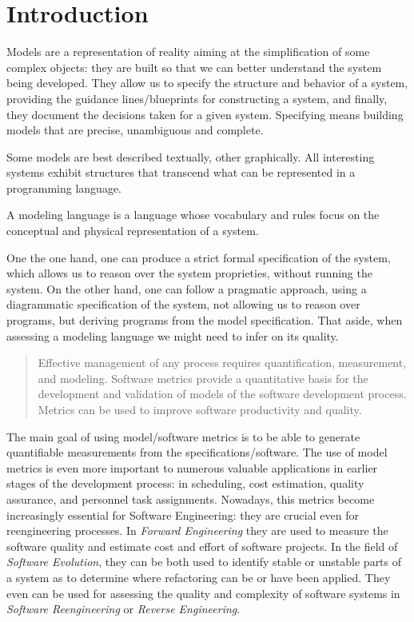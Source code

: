 \section{Introduction}

Models are a representation of reality aiming at the simplification of some complex objects: they are built so that we can better understand the system being developed.
They allow us to specify the structure and behavior of a system, providing the guidance lines/blueprints for constructing a system, and finally, they document the decisions taken for a given system.
Specifying means building models that are precise, unambiguous and complete. 

Some models are best described textually, other graphically. All interesting systems exhibit structures that transcend what can be represented in a programming language.

A modeling language is a language whose vocabulary and rules focus on the conceptual and physical representation of a system.%


One the one hand, one can produce a strict formal specification of the system, which allows us to reason over the system proprieties, without running the system.
On the other hand, one can follow a pragmatic approach, using a diagrammatic specification of the system, not allowing us to reason over programs,
but deriving programs from the model specification. That aside, when assessing a modeling language we might need to infer on its quality.

\begin{quotation}
Effective management of any process requires quantification, measurement, and modeling.
Software metrics provide a quantitative basis for the development and validation of models of the software development process.
Metrics can be used to improve software productivity and quality\cite{g1:Millis:1998}.
\end{quotation}

The main goal of using model/software metrics is to be able to generate quantifiable measurements from the specifications/software. The use of model metrics is even more
important to numerous valuable applications in earlier stages of the development process: in scheduling, cost estimation, quality assurance, and personnel task assignments.
Nowadays, this metrics become increasingly essential for Software Engineering: they are crucial even for reengineering processes.
In \emph{Forward Engineering} they are used to measure the software quality and estimate cost and effort of software projects\cite{Fenton}.
In the field of \emph{Software Evolution}, they can be both used to identify stable or unstable parts of a system as to determine where refactoring can be or have been applied\cite{Serge}.
They even can be used for assessing the quality and complexity of software systems in \emph{Software Reengineering} or \emph{Reverse Engineering}\cite{43044}.

